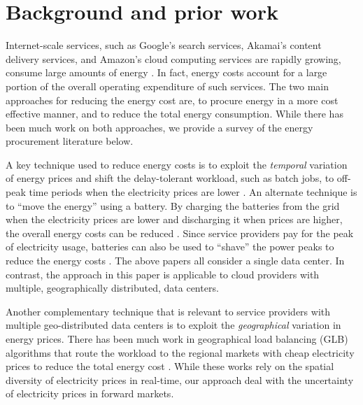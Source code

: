 \section{Background and prior work}
Internet-scale services, such as  Google's search services, Akamai's content delivery services, and Amazon's cloud computing services are rapidly growing, consume large amounts of energy \cite{koomey2011growth}. In fact, energy costs account for a large portion of the overall operating expenditure of such services.  The two main approaches for reducing the energy cost are, to procure energy in a more cost effective manner, and to reduce the total energy consumption. While there has been much work on both approaches, we provide a survey of the energy procurement literature below.



A key technique used to reduce energy costs is to exploit the {\em temporal} variation of energy prices and shift the delay-tolerant workload, such as batch jobs, to off-peak time periods when the electricity prices are lower \cite{gandhi2011minimizing, lin2013dynamic, meisner2011power, zhang2012dynamic}. An alternate technique is to ``move the energy'' using a battery. By charging the batteries from the grid when the electricity prices are lower and discharging it when prices are higher,  the overall energy costs can be reduced \cite{urgaonkar2011optimal, liu2013data}. Since service providers pay for the peak of electricity usage, batteries can also be used to ``shave'' the power peaks to reduce the energy costs \cite{palasamudram2012using}. The above papers all consider a single data center. In contrast, the  approach in this paper is applicable to cloud providers with multiple, geographically distributed, data centers.

Another complementary technique that is relevant to service providers with multiple geo-distributed data centers is to exploit the {\em geographical} variation in energy prices. There has been much work in geographical load balancing (GLB) algorithms that route the workload to the regional markets with cheap electricity prices to reduce the total energy cost \cite{qureshi2009cutting,liu2011greening}. While these works rely on the spatial diversity of electricity prices in real-time, our approach deal with the uncertainty of electricity prices in forward markets.

